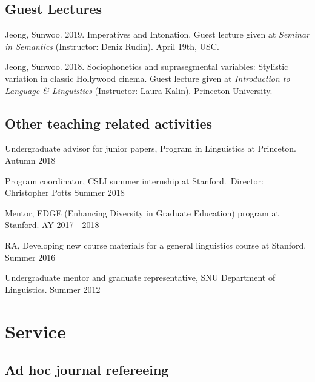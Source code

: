 \documentclass[letterpaper]{article}
\renewenvironment{itemize}{
  \begin{list}{}{
    \setlength{\leftmargin}{1.5em}
  }
}{
  \end{list}
}
\begin{document}
\subsection*{Guest Lectures}

\begin{itemize}
\item Jeong, Sunwoo. 2019. Imperatives and Intonation. Guest lecture given at \emph{Seminar in Semantics} (Instructor: Deniz Rudin). April 19th, USC.
\item Jeong, Sunwoo. 2018. Sociophonetics and suprasegmental variables: Stylistic variation in classic Hollywood cinema. Guest lecture given at \emph{Introduction to Language \& Linguistics} (Instructor: Laura Kalin). Princeton University.
\end{itemize}

\subsection*{Other teaching related activities}

\begin{itemize}\itemsep -1pt
\item Undergraduate advisor for junior papers, Program in Linguistics at Princeton. \hfill Autumn 2018

\item Program coordinator, CSLI summer internship at Stanford.\ Director: Christopher Potts \hfill Summer 2018

\item Mentor, EDGE (Enhancing Diversity in Graduate Education) program at Stanford. \hfill AY 2017 - 2018

\item RA, Developing new course materials for a general linguistics course at Stanford. \hfill Summer 2016 %

\item Undergraduate mentor and graduate representative, SNU Department of Linguistics. \hfill Summer 2012
\end{itemize}

\section*{Service}

\subsection*{Ad hoc journal refereeing}
\end{document}
